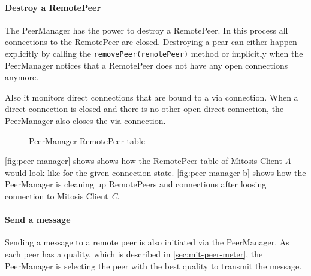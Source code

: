 \paragraph{Destroy a RemotePeer}
The PeerManager has the power to destroy a RemotePeer. In this process all connections to the RemotePeer are closed. 
Destroying a pear can either happen explicitly by calling the \lstinline|removePeer(remotePeer)| method or implicitly when the PeerManager notices that a RemotePeer does not have any open connections anymore.

Also it monitors direct connections that are bound to a via connection. When a direct connection is closed and there is no other open direct connection, the PeerManager also closes the via connection.

\begin{figure}
  \centering
    \hspace{1 cm}
	\caption{PeerManager RemotePeer table}
\label{fig:peer-manager}
\end{figure}

\vref{fig:peer-manager} shows shows how the RemotePeer table of Mitosis Client \textit{A} would look like for the given connection state. \vref{fig:peer-manager-b} shows how the PeerManager is cleaning up RemotePeers and connections after loosing connection to Mitosis Client \textit{C}. 

\paragraph{Send a message}
Sending a message to a remote peer is also initiated via the PeerManager. As each peer has a quality, which is described in \vref{sec:mit-peer-meter}, the PeerManager is selecting the peer with the best quality to transmit the message.

